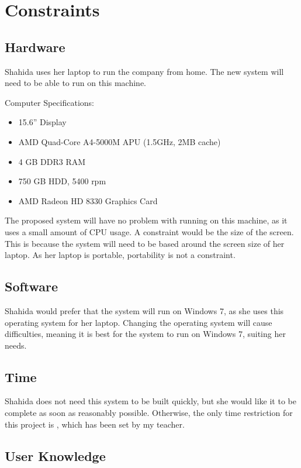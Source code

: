 \section{Constraints}

\subsection{Hardware}
Shahida uses her laptop to run the company from home. The new system will need to be able to run on this machine.

Computer Specifications:

\begin{itemize}
    \item 15.6” Display
    \item AMD Quad-Core A4-5000M APU (1.5GHz, 2MB cache)
    \item 4 GB DDR3 RAM
    \item 750 GB HDD, 5400 rpm
    \item AMD Radeon HD 8330 Graphics Card
\end{itemize}

The proposed system will have no problem with running on this machine, as it uses a small amount of CPU usage. A constraint would be the size of the screen. This is because the system will need to be based around the screen size of her laptop. As her laptop is portable, portability is not a constraint.

\subsection{Software}

Shahida would prefer that the system will run on Windows 7, as she uses this operating system for her laptop. Changing the operating system will cause difficulties, meaning it is best for the system to run on Windows 7, suiting her needs.

\subsection{Time}

Shahida does not need this system to be built quickly, but she would like it to be complete as soon as reasonably possible. Otherwise, the only time restriction for this project is , which has been set by my teacher.

\subsection{User Knowledge}

